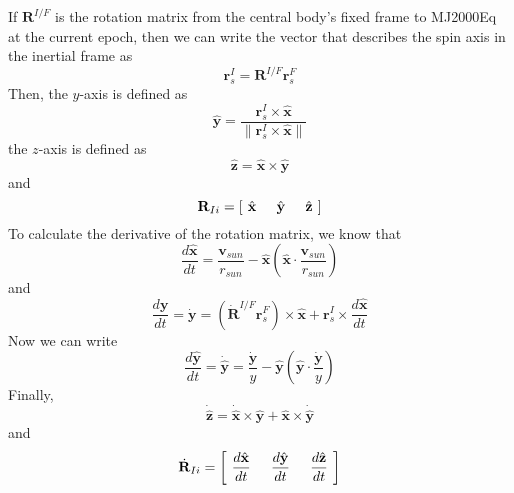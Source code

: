 {If $\mathbf{R}^{I/F}$ is the rotation matrix from the central body's fixed frame to
MJ2000Eq at the current epoch, then we can write the vector that
describes the spin axis in the inertial frame as
%
\begin{equation}
     \mathbf{r}_s^I =  \mathbf{R}^{I/F} \mathbf{r}_s^F
\end{equation}
%
Then, the $y$-axis is defined as
%
\begin{equation}
     \hat{\mathbf{y}} = \frac{\mathbf{r}_s^I \times \hat{\mathbf{x}}  }{\|  \mathbf{r}_s^I\times \hat{\mathbf{x}}   \|}
\end{equation}
%
the $z$-axis is defined as
%
\begin{equation}
     \hat{\mathbf{z}} = \hat{\mathbf{x}} \times \hat{\mathbf{y}}
\end{equation}
%
and
%
\begin{equation}
     \mathbf{R}_{Ii} = \left[\hspace{.05 in} \hat{\mathbf{x}} \hspace{.2 in} \hat{\mathbf{y}} \hspace{.2 in} \hat{\mathbf{z}} \hspace{.05 in} \right]
\end{equation}
%
To calculate the derivative of the rotation matrix, we know that
%
%
\begin{equation}
     \frac{d\hat{\mathbf{x}}}{dt} =      \displaystyle\frac{\mathbf{v}_{sun}}{r_{sun}}  -\displaystyle
     \hat{\mathbf{x}}
     \left(\hat{\mathbf{x}}  \cdot
     \frac{\mathbf{v}_{sun}}{r_{sun}} \right)
\end{equation}
%
and
%
\begin{equation}
      \frac{d\mathbf{y}}{dt}  = \dot{\mathbf{y}}=\left(\dot{\mathbf{R}}^{I/F}\mathbf{r}_s^F\right) \times
      \hat{\mathbf{x}} + \mathbf{r}_s^I \times
      \frac{d\hat{\mathbf{x}}}{dt}
\end{equation}
%
Now we can write
%
\begin{equation}
     \frac{d\hat{\mathbf{y}}}{dt} = \dot{\hat{\mathbf{y}}} =
     \frac{\dot{\mathbf{y}}}{y} - \hat{\mathbf{y}}\left(\hat{\mathbf{y}} \cdot \frac{\dot{\mathbf{y}}}{y}  \right)
\end{equation}
%
Finally,
\begin{equation}
    \dot{\hat{\mathbf{z}}} = \dot{\hat{\mathbf{x}}} \times
    \hat{\mathbf{y}}+ \hat{\mathbf{x}} \times
    \dot{\hat{\mathbf{y}}}
\end{equation}
%
and
%
\begin{equation}
     \dot{\mathbf{R}}_{Ii} = \left[\hspace{.05 in} \frac{d\hat{\mathbf{x}}}{dt} \hspace{.2 in}
     \frac{d\hat{\mathbf{y}}}{dt} \hspace{.2 in} \frac{d\hat{\mathbf{z}}}{dt} \hspace{.05 in} \right]
\end{equation}


}
